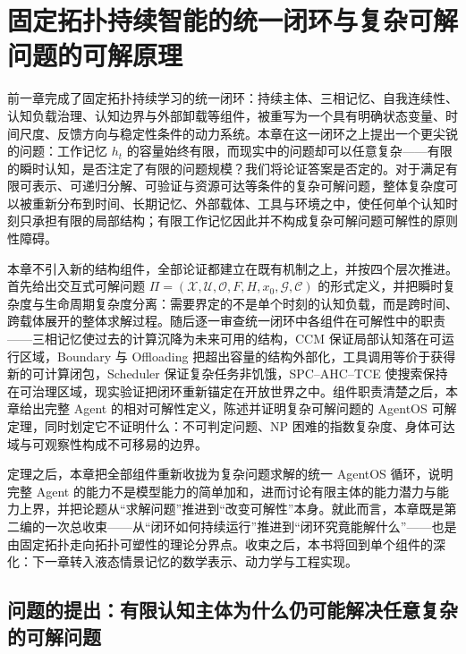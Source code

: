\chapter{固定拓扑持续智能的统一闭环与复杂可解问题的可解原理}
\label{chap:fixed-topology-solvability}

\begin{chapterlead}
前一章完成了固定拓扑持续学习的统一闭环：持续主体、三相记忆、自我连续性、认知负载治理、认知边界与外部卸载等组件，被重写为一个具有明确状态变量、时间尺度、反馈方向与稳定性条件的动力系统。本章在这一闭环之上提出一个更尖锐的问题：工作记忆 $h_t$ 的容量始终有限，而现实中的问题却可以任意复杂——有限的瞬时认知，是否注定了有限的问题规模？我们将论证答案是否定的。对于满足有限可表示、可递归分解、可验证与资源可达等条件的复杂可解问题，整体复杂度可以被重新分布到时间、长期记忆、外部载体、工具与环境之中，使任何单个认知时刻只承担有限的局部结构；有限工作记忆因此并不构成复杂可解问题可解性的原则性障碍。

本章不引入新的结构组件，全部论证都建立在既有机制之上，并按四个层次推进。首先给出交互式可解问题 $\Pi=(\mathcal X,\mathcal U,\mathcal O,F,H,x_0,\mathcal G,\mathcal C)$ 的形式定义，并把瞬时复杂度与生命周期复杂度分离：需要界定的不是单个时刻的认知负载，而是跨时间、跨载体展开的整体求解过程。随后逐一审查统一闭环中各组件在可解性中的职责——三相记忆使过去的计算沉降为未来可用的结构，CCM 保证局部认知落在可运行区域，Boundary 与 Offloading 把超出容量的结构外部化，工具调用等价于获得新的可计算闭包，Scheduler 保证复杂任务非饥饿，SPC--AHC--TCE 使搜索保持在可治理区域，现实验证把闭环重新锚定在开放世界之中。组件职责清楚之后，本章给出完整 Agent 的相对可解性定义，陈述并证明复杂可解问题的 AgentOS 可解定理，同时划定它不证明什么：不可判定问题、NP 困难的指数复杂度、身体可达域与可观察性构成不可移易的边界。

定理之后，本章把全部组件重新收拢为复杂问题求解的统一 AgentOS 循环，说明完整 Agent 的能力不是模型能力的简单加和，进而讨论有限主体的能力潜力与能力上界，并把论题从``求解问题''推进到``改变可解性''本身。就此而言，本章既是第二编的一次总收束——从``闭环如何持续运行''推进到``闭环究竟能解什么''——也是由固定拓扑走向拓扑可塑性的理论分界点。收束之后，本书将回到单个组件的深化：下一章转入液态情景记忆的数学表示、动力学与工程实现。
\end{chapterlead}

\section{问题的提出：有限认知主体为什么仍可能解决任意复杂的可解问题}

